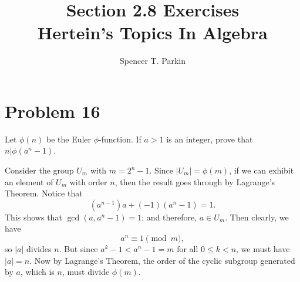 \documentclass[12pt]{article}
\title{Section 2.8 Exercises\\Hertein's Topics In Algebra}
\author{Spencer T. Parkin}
\begin{document}
\maketitle

\section*{Problem 16}

Let $\phi(n)$ be the Euler $\phi$-function.  If $a>1$ is an integer, prove that
$n|\phi(a^n-1)$.

Consider the group $U_m$ with $m=2^n-1$.
Since $|U_m|=\phi(m)$, if we can exhibit an element of $U_m$
with order $n$, then the result goes through by Lagrange's Theorem.
Notice that
\begin{equation*}
(a^{n-1})a + (-1)(a^n-1) = 1.
\end{equation*}
This shows that $\gcd(a,a^n-1)=1$; and therefore, $a\in U_m$.
Then clearly, we have
\begin{equation*}
a^n\equiv 1\pmod{m},
\end{equation*}
so $|a|$ divides $n$.  But since $a^k-1<a^n-1=m$ for all $0\leq k<n$,
we must have $|a|=n$.  Now by Lagrange's Theorem, the order of
the cyclic subgroup generated by $a$, which is $n$, must divide $\phi(m)$.
\end{document}
